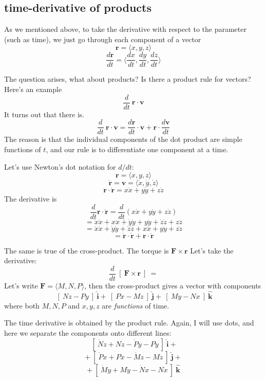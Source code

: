 \documentclass[11pt, oneside]{article}
\begin{document}
\subsection*{time-derivative of products}
As we mentioned above, to take the derivative with respect to the parameter (such as time), we just go through each component of a vector
\[ \mathbf{r} = \langle x, y, z \rangle \]
\[ \frac{d \mathbf{r}}{dt} =  \langle \frac{dx}{dt}, \frac{dy}{dt}, \frac{dz}{dt} \rangle \]

The question arises, what about products?  Is there a product rule for vectors?  Here's an example
\[ \frac{d}{dt} \ \mathbf{r} \cdot \mathbf{v} \]
It turns out that there is.
\[ \frac{d}{dt} \ \mathbf{r} \cdot \mathbf{v} = \frac{d \mathbf{r}}{dt} \cdot \mathbf{v} + \mathbf{r} \cdot \frac{d \mathbf{v}}{dt}  \]
The reason is that the individual components of the dot product are simple functions of $t$, and our rule is to differentiate one component at a time.

Let's use Newton's dot notation for $d/dt$:
\[ \mathbf{r} = \langle x, y, z\rangle \]
\[ \mathbf{\dot{r}} = \mathbf{v} = \langle \dot{x}, \dot{y}, \dot{z} \rangle \]
\[ \mathbf{r} \cdot \mathbf{\dot{r}}  = x \dot{x} + y \dot{y} + z \dot{z} \]
The derivative is
\[ \frac{d}{dt} \mathbf{r} \cdot \mathbf{\dot{r}}  = \frac{d}{dt} ( x \dot{x} + y \dot{y} + z \dot{z} ) \]
\[ = \dot{x} \dot{x} + x \ddot{x} + \dot{y} \dot{y} + y \ddot{y} + \dot{z} \dot{z} + z \ddot{z}  \]
\[ = \dot{x} \dot{x} + \dot{y} \dot{y} + \dot{z} \dot{z} + x \ddot{x}  + y \ddot{y} + z \ddot{z}  \]
\[ =  \mathbf{\dot{r}} \cdot \mathbf{\dot{r}} +  \mathbf{r} \cdot \mathbf{\ddot{r}} \]

The same is true of the cross-product.  The torque is $\mathbf{F} \times \mathbf{r}$  Let's take the derivative:
\[ \frac{d}{dt} \ [ \ \mathbf{F} \times \mathbf{r} \ ] \ = \]
Let's write $\mathbf{F} = \langle M,N,P \rangle$, then the cross-product gives a vector with components
\[ \ [ \ N z - P y \ ] \ \mathbf{\hat{i}} + \ [ \ P x - M z \ ] \ \mathbf{\hat{j}} + \ [ \ M y - N x \ ] \ \mathbf{\hat{k}} \]
where both $M,N,P$ and $x,y,z$ are \emph{functions} of time.

The time derivative is obtained by the product rule.  Again, I will use dots, and here we separate the components onto different lines:
\[ \ [ \ \dot{N} z + N \dot{z} - \dot{P} y - P \dot{y} \ ] \ \mathbf{\hat{i}} + \]
\[ + \  [ \ \dot{P} x + P \dot{x} - \dot{M} z - M \dot{z} \ ] \ \mathbf{\hat{j}} + \]
\[ +  \ [ \ \dot{M} y + M \dot{y} - \dot{N} x - N \dot{x} \ ] \ \mathbf{\hat{k}} \]
\end{document}
